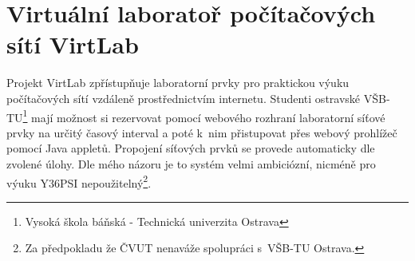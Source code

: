 \section{Virtuální laboratoř počítačových sítí VirtLab}
Projekt VirtLab \cite{reserse:virtlab} zpřístupňuje laboratorní prvky pro praktickou výuku počítačových sítí vzdáleně prostřednictvím internetu. Studenti ostravské VŠB-TU\footnote{Vysoká škola báňská - Technická univerzita Ostrava} mají možnost si rezervovat pomocí webového rozhraní laboratorní síťové prvky na určitý časový interval a poté k~nim přistupovat přes webový prohlížeč pomocí Java appletů. Propojení síťových prvků se provede automaticky dle zvolené úlohy. Dle mého názoru je to systém velmi ambiciózní, nicméně pro výuku Y36PSI nepoužitelný\footnote{Za předpokladu že ČVUT nenaváže spolupráci s~VŠB-TU Ostrava.}.




